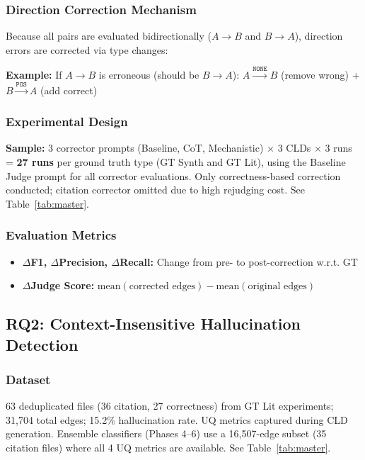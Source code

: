 \subsubsection{Direction Correction Mechanism}
Because all pairs are evaluated bidirectionally ($A \rightarrow B$ and $B \rightarrow A$), direction errors are corrected via type changes:

\textbf{Example:} If $A \rightarrow B$ is erroneous (should be $B \rightarrow A$):
$A \xrightarrow{\texttt{NONE}} B$ (remove wrong) + $B \xrightarrow{\texttt{POS}} A$ (add correct)

\subsubsection{Experimental Design}
\textbf{Sample:} 3 corrector prompts (Baseline, CoT, Mechanistic) $\times$ 3 CLDs $\times$ 3 runs = \textbf{27 runs} per ground truth type (GT Synth and GT Lit), using the Baseline Judge prompt for all corrector evaluations. Only correctness-based correction conducted; citation corrector omitted due to high rejudging cost. See Table~\ref{tab:master}.

\subsubsection{Evaluation Metrics}
\begin{itemize}[noitemsep]
    \item \textbf{$\Delta$F1, $\Delta$Precision, $\Delta$Recall:} Change from pre- to post-correction w.r.t. GT
    \item \textbf{$\Delta$Judge Score:} $\text{mean}(\text{corrected edges}) - \text{mean}(\text{original edges})$
\end{itemize}

\subsection{RQ2: Context-Insensitive Hallucination Detection}

\subsubsection{Dataset}
63 deduplicated files (36 citation, 27 correctness) from GT Lit experiments; 31,704 total edges; 15.2\% hallucination rate. UQ metrics captured during CLD generation. Ensemble classifiers (Phases 4--6) use a 16,507-edge subset (35 citation files) where all 4 UQ metrics are available. See Table~\ref{tab:master}.

